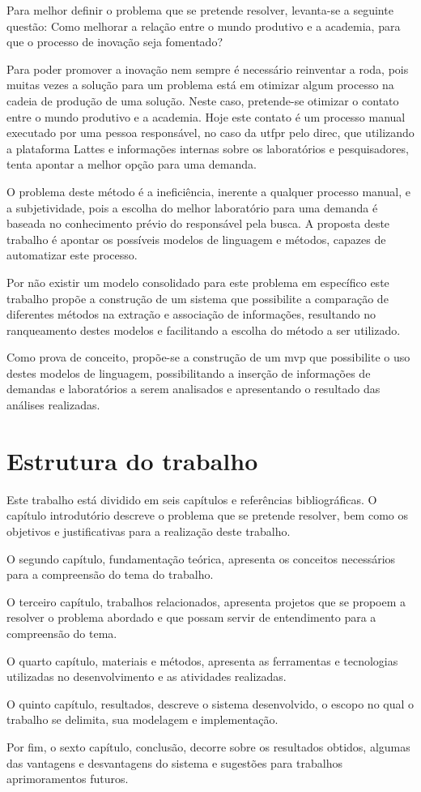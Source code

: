Para melhor definir o problema que se pretende resolver, levanta-se a seguinte questão: Como melhorar a relação entre o mundo produtivo e a academia, para que o processo de inovação seja fomentado?

Para poder promover a inovação nem sempre é necessário reinventar a roda, pois muitas vezes a solução para um problema está em otimizar algum processo na cadeia de produção de uma solução. Neste caso, pretende-se otimizar o contato entre o mundo produtivo e a academia. Hoje este contato é um processo manual executado por uma pessoa responsável, no caso da \gls{utfpr} pelo \gls{direc}, que utilizando a plataforma Lattes e informações internas sobre os laboratórios e pesquisadores, tenta apontar a melhor opção para uma demanda.

O problema deste método é a ineficiência, inerente a qualquer processo manual, e a subjetividade, pois a escolha do melhor laboratório para uma demanda é baseada no conhecimento prévio do responsável pela busca. A proposta deste trabalho é apontar os possíveis modelos de linguagem e métodos, capazes de automatizar este processo.

Por não existir um modelo consolidado para este problema em específico este trabalho propõe a construção de um sistema que possibilite a comparação de diferentes métodos na extração e associação de informações, resultando no ranqueamento destes modelos e facilitando a escolha do método a ser utilizado.

Como prova de conceito, propõe-se a construção de um \gls{mvp} que possibilite o uso destes modelos de linguagem, possibilitando a inserção de informações de demandas e laboratórios a serem analisados e apresentando o resultado das análises realizadas.

\section{Estrutura do trabalho}\label{sec:estruturaTrabalho}

Este trabalho está dividido em seis capítulos e referências bibliográficas. O capítulo introdutório descreve o problema que se pretende resolver, bem como os objetivos e justificativas para a realização deste trabalho. 

O segundo capítulo, fundamentação teórica, apresenta os conceitos necessários para a compreensão do tema do trabalho.

O terceiro capítulo, trabalhos relacionados, apresenta projetos que se propoem a resolver o problema abordado e que possam servir de entendimento para a compreensão do tema.

O quarto capítulo, materiais e métodos, apresenta as ferramentas e tecnologias utilizadas no desenvolvimento e as atividades realizadas.

O quinto capítulo, resultados, descreve o sistema desenvolvido, o escopo no qual o trabalho se delimita, sua modelagem e implementação.

Por fim, o sexto capítulo, conclusão, decorre sobre os resultados obtidos, algumas das vantagens e desvantagens do sistema e sugestões para trabalhos aprimoramentos futuros.